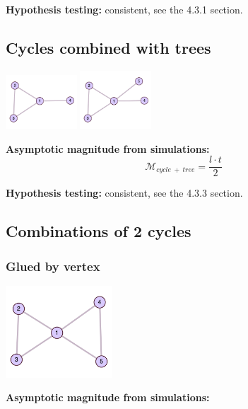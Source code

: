 \documentclass{article}
\begin{document}
\textbf{Hypothesis testing:} consistent, see the 4.3.1 section. 

\subsection{Cycles combined with trees}
\begin{center}
    \includegraphics[width=0.2\textwidth]{cicle_tree1_exp}
    \includegraphics[width=0.2\textwidth]{cicle_tree2_exp}
\end{center}

\textbf{Asymptotic magnitude from simulations:}
\\

$$\mathcal{M}_{cycle \ + \ tree} = \frac{l \cdot t}{2}$$



\textbf{Hypothesis testing:} consistent, see the 4.3.3 section. 


\subsection{Combinations of 2 cycles}
\subsubsection{Glued by vertex}

\begin{center}
\includegraphics[width=0.3\textwidth]{2cicles_v_exp} 
\end{center}

\textbf{Asymptotic magnitude from simulations:}
\\
\end{document}
